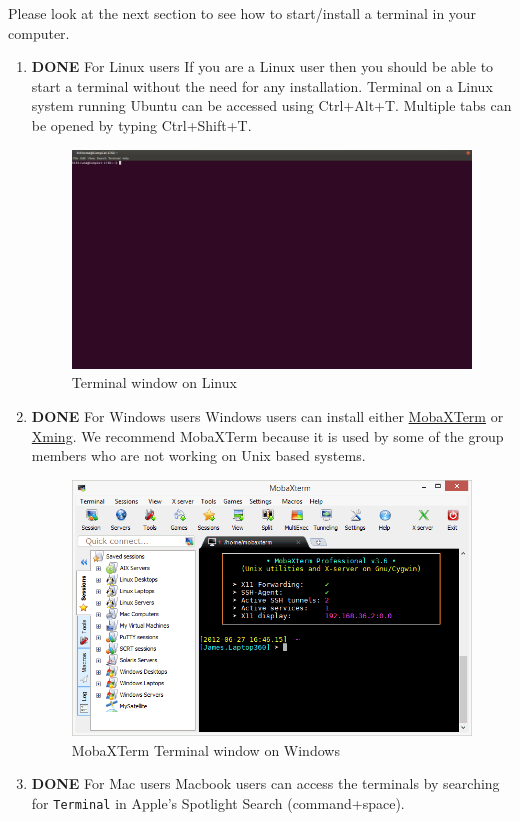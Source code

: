 \documentclass[11pt]{article}
\begin{document}
Please look at the next section to see how to start/install a terminal in your computer.
\begin{enumerate}
\item {\bfseries\sffamily DONE} For Linux users
\label{sec-2-1-1-1}
If you are a Linux user then you should be able to start a terminal without the need for any installation. Terminal on a Linux system running Ubuntu can be accessed using Ctrl+Alt+T. Multiple tabs can be opened by typing Ctrl+Shift+T.
\begin{figure}[htb]
\centering
\includegraphics[width=.9\linewidth]{./figures/Ubuntu-terminal.png}
\caption{Terminal window on Linux}
\end{figure}

\item {\bfseries\sffamily DONE} For Windows users
\label{sec-2-1-1-2}
Windows users can install either \href{http://mobaxterm.mobatek.net/}{MobaXTerm} or \href{http://www.straightrunning.com/XmingNotes/}{Xming}. We recommend MobaXTerm because it is used by some of the group members who are not working on Unix based systems.
\begin{figure}[htb]
\centering
\includegraphics[width=.9\linewidth]{./figures/moba.png}
\caption{MobaXTerm Terminal window on Windows}
\end{figure}

\item {\bfseries\sffamily DONE} For Mac users
\label{sec-2-1-1-3}
Macbook users can access the terminals by searching for \texttt{Terminal} in Apple's Spotlight Search (command+space).
\end{enumerate}
\end{document}
